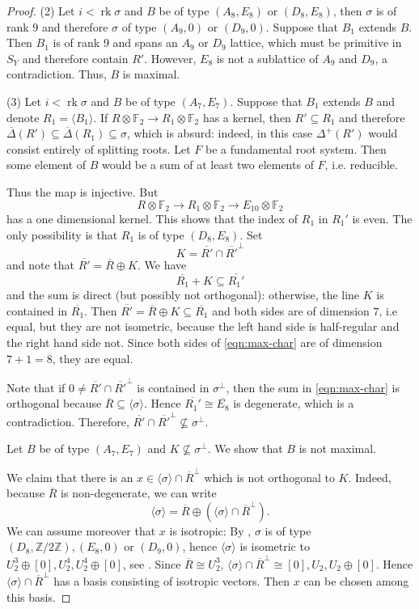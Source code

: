 \documentclass[a4paper]{amsart}
\theoremstyle{definition}
\theoremstyle{plain}
\DeclareMathOperator{\rk}{rk}
\newcommand{\FF}{\mathbb{F}}
\newcommand{\ZZ}{\mathbb{Z}}
\begin{document}
\begin{proof}
(2) Let $i< \rk \sigma$ and $B$ be of type $(A_8,E_8)$ or $(D_8,E_8)$, then $\sigma$ is of rank $9$ and therefore $\sigma$ of type $(A_9, 0)$ or $(D_9, 0)$. 
Suppose that $B_1$ extends $B$. Then $B_1$ is of rank $9$ and spans an $A_9$ or $D_9$ lattice, which must be primitive in $S_Y$ and therefore contain $R'$. However, $E_8$ is not a sublattice of $A_9$ and $D_9$, a contradiction. Thus, $B$ is maximal. 

(3) Let $i < \rk \sigma$ and $B$ be of type $(A_7,E_7)$. 
Suppose that $B_1$ extends $B$ and denote  $R_1=\langle B_1\rangle$. 
If $R \otimes \FF_2 \to R_1 \otimes \FF_2$ has a kernel, then $R' \subseteq R_1$ and therefore $\overline{\Delta}(R') \subseteq \overline{\Delta}(R_1)\subseteq \sigma$, which is absurd:
indeed, in this case $\Delta^+(R')$ would consist entirely of splitting roots. Let $F$ be a fundamental root system. Then some element of $B$ would be a sum of at least two elements of $F$, i.e. reducible.

Thus the map is injective. But
\[R \otimes \FF_2 \to R_1 \otimes \FF_2 \to E_{10}\otimes \FF_2\]
has a one dimensional kernel. This shows that the index of $R_1$ in $R_1'$ is even. The only possibility is that $R_1$ is of type $(D_8,E_8)$.
Set 
\[K=\overline{R'}\cap \overline{R'}^\perp\]
and note that 
$\overline{R'}=\overline{R}\oplus K$.
We have
\begin{equation}\label{eqn:max-char}
\overline{R_1}+K \subseteq \overline{R_1'}
\end{equation}
and the sum is direct (but possibly not orthogonal): otherwise, the line $K$ is contained in $\overline{R_1}$. Then $\overline{R'}=\overline{R}\oplus K \subseteq \overline{R_1}$ and both sides are of dimension $7$, i.e equal, but they are not isometric, because the left hand side is half-regular and the right hand side not. 
Since both sides of \cref{eqn:max-char} are of dimension $7+1=8$, they are equal.

Note that if $0 \neq \overline{R'}\cap \overline{R'}^\perp$ is contained in $\sigma^\perp$, then the sum in \cref{eqn:max-char} is orthogonal because $\overline{R}\subseteq \langle \sigma \rangle$. Hence
$\overline{R_1'}\cong \overline{E_8}$ is degenerate, which is a contradiction. Therefore, $\overline{R'}\cap\overline{R'}^\perp \not\subseteq \sigma^\perp$.

Let $B$ be of type $(A_7,E_7)$ and $K \not\subseteq \sigma^\perp$. We show that $B$ is not maximal.

We claim that there is an $x \in \langle \sigma \rangle\cap \overline{R}^\perp$
which is not orthogonal to $K$. 
Indeed, because $\overline{R}$ is non-degenerate, we can write
\[\langle \sigma \rangle=\overline{R} \oplus (\langle \sigma \rangle\cap \overline{R}^\perp).\]
We can assume moreover that $x$ is isotropic:
By , $\sigma$ is of type $(D_8, \ZZ/2\ZZ),(E_8, 0)$ or $(D_9, 0)$, hence 
$\langle \sigma \rangle$ is isometric to $U_2^3\oplus [0], U_2^4, U_2^4\oplus [0]$, see . Since $\overline{R}\cong U_2^3$, $\langle \sigma \rangle\cap \overline{R}^\perp\cong [0],U_2,U_2\oplus [0]$.
Hence $\langle \sigma \rangle\cap \overline{R}^\perp$ has a basis consisting of isotropic vectors. Then $x$ can be chosen among this basis. 


\end{proof}
\end{document}
